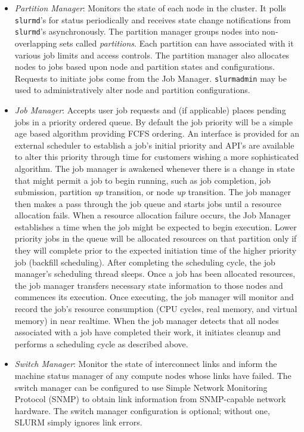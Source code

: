 \begin{itemize}
\item {\em Partition Manager}: Monitors the state of each 
node in the cluster.  It polls {\tt slurmd}'s for status periodically and 
receives state change notifications from {\tt slurmd}'s asynchronously.
The partition manager groups nodes into non-overlapping sets 
called {\em partitions}. Each partition can have associated with 
it various job limits and access controls.
The partition manager also allocates nodes to jobs based upon 
node and partition states and configurations. Requests to initiate 
jobs come from the Job Manager.
{\tt slurmadmin} may be used to administratively alter node and 
partition configurations.

\item {\em Job Manager}: Accepts user job requests and (if applicable) 
places pending jobs in a priority ordered queue. By default the job 
priority will be a simple age based algorithm providing FCFS ordering. 
An interface is provided for an external scheduler to establish 
a job's initial priority and API's are available to alter this priority 
through time for customers wishing a more sophisticated algorithm.
The job manager is awakened whenever there is a change in state that 
might permit a job to begin running, such as job completion, job submission, 
partition {\em up} transition, or node {\em up} transition.
The job manager then makes a pass through the job queue and
starts jobs until a resource allocation fails. 
When a resource allocation failure occurs, the Job Manager establishes 
a time when the job might be expected to begin execution. 
Lower priority jobs in the queue will be allocated resources on that 
partition only if they will complete prior to the expected initiation 
time of the higher priority job (backfill scheduling).
After completing the scheduling cycle, the job manager's scheduling 
thread sleeps.
Once a job has been allocated resources, the job manager transfers 
necessary state information to those nodes and commences its execution. 
Once executing, the job manager will monitor and record the job's resource 
consumption (CPU cycles, real memory, and virtual memory) in near realtime.
When the job manager detects that all nodes associated with a 
job have completed their work, it initiates cleanup and performs a 
scheduling cycle as described above.

\item {\em Switch Manager}:  Monitor the state of interconnect links 
and inform the machine status manager of any compute nodes whose links
have failed.  The switch manager can be configured
to use Simple Network Monitoring Protocol (SNMP) to obtain link
information from SNMP-capable network hardware.
The switch manager configuration is optional;  without one, 
SLURM simply ignores link errors.

\end{itemize}

